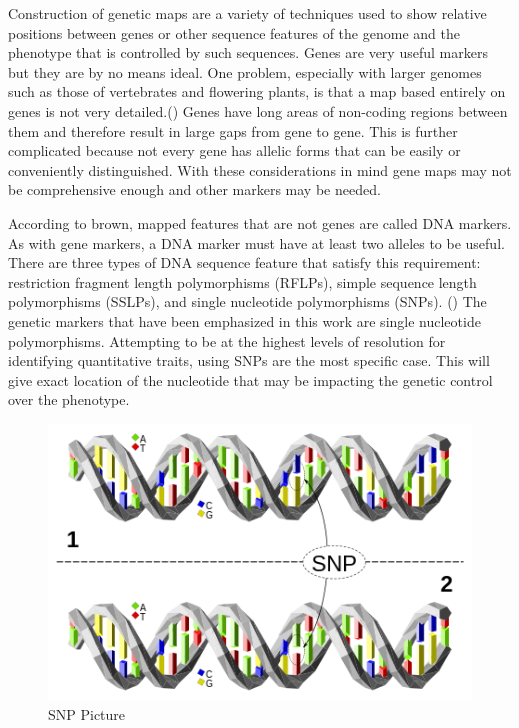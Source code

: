\documentclass[11pt,]{book}
\theoremstyle{definition}
\theoremstyle{definition}
\theoremstyle{remark}
\begin{document}
Construction of genetic maps are a variety of techniques used to show
relative positions between genes or other sequence features of the
genome and the phenotype that is controlled by such sequences. Genes are
very useful markers but they are by no means ideal. One problem,
especially with larger genomes such as those of vertebrates and
flowering plants, is that a map based entirely on genes is not very
detailed.(\cite{brown2006genomes}) Genes have long areas of non-coding
regions between them and therefore result in large gaps from gene to
gene. This is further complicated because not every gene has allelic
forms that can be easily or conveniently distinguished. With these
considerations in mind gene maps may not be comprehensive enough and
other markers may be needed.

According to brown, mapped features that are not genes are called DNA
markers. As with gene markers, a DNA marker must have at least two
alleles to be useful. There are three types of DNA sequence feature that
satisfy this requirement: restriction fragment length polymorphisms
(RFLPs), simple sequence length polymorphisms (SSLPs), and single
nucleotide polymorphisms (SNPs). (\cite{brown2006genomes}) The genetic
markers that have been emphasized in this work are single nucleotide
polymorphisms. Attempting to be at the highest levels of resolution for
identifying quantitative traits, using SNPs are the most specific case.
This will give exact location of the nucleotide that may be impacting
the genetic control over the phenotype.

\begin{figure}

{\centering \includegraphics[width=0.8\linewidth]{images/SNP_Picture} 

}

\caption{SNP Picture}\label{fig:Snp-Pic}
\end{figure}
\end{document}

